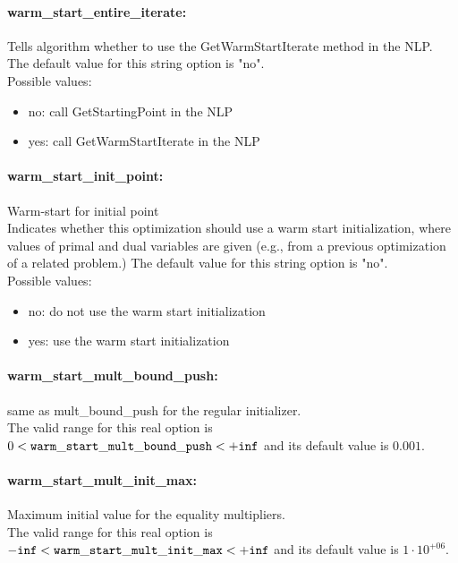 \paragraph{warm\_start\_entire\_iterate:}\label{sec:warm_start_entire_iterate} Tells algorithm whether to use the GetWarmStartIterate method in the NLP. $\;$ \\

The default value for this string option is "no".
\\ 
Possible values:
\begin{itemize}
   \item no: call GetStartingPoint in the NLP
   \item yes: call GetWarmStartIterate in the NLP
\end{itemize}

\paragraph{warm\_start\_init\_point:}\label{sec:warm_start_init_point} Warm-start for initial point $\;$ \\
 Indicates whether this optimization should use a
warm start initialization, where values of primal
and dual variables are given (e.g., from a
previous optimization of a related problem.)
The default value for this string option is "no".
\\ 
Possible values:
\begin{itemize}
   \item no: do not use the warm start initialization
   \item yes: use the warm start initialization
\end{itemize}

\paragraph{warm\_start\_mult\_bound\_push:}\label{sec:warm_start_mult_bound_push} same as mult\_bound\_push for the regular initializer. $\;$ \\
 The valid range for this real option is 
$0 <  {\tt warm\_start\_mult\_bound\_push } <  {\tt +inf}$
and its default value is $0.001$.


\paragraph{warm\_start\_mult\_init\_max:}\label{sec:warm_start_mult_init_max} Maximum initial value for the equality multipliers. $\;$ \\
 The valid range for this real option is 
${\tt -inf} <  {\tt warm\_start\_mult\_init\_max } <  {\tt +inf}$
and its default value is $1 \cdot 10^{+06}$.


